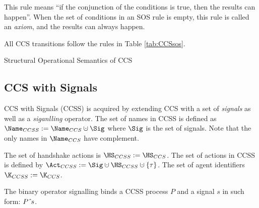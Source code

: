 \documentclass[adraft,hidelinks]{eptcs}
\begin{document}
This rule means ``if the conjunction of the conditions is true, then the results can happen''.
When the set of conditions in an SOS rule is empty, this rule is called an \emph{axiom}, and the results can always happen.

All CCS transitions follow the rules in Table \ref{tab:CCSsos}.

\begin{table}[t]
\normalsize
\centering
\caption{Structural Operational Semantics of CCS}
\label{tab:CCSsos}
\end{table}


\subsection{CCS with Signals}
\label{sec:ccss}
CCS with Signals (CCSS) \cite{DvGH17} is acquired by extending CCS with a set of \emph{signals} as well as a \emph{siganlling} operator.
The set of names in CCSS is defined as $\Name_{CCSS} := \Name_{CCS} \dcup \Sig$ where $\Sig$ is the set of signals.
Note that the only names in $\Name_{CCS}$ have complement.

The set of handshake actions is $\HS_{CCSS} := \HS_{CCS}$.
The set of actions in CCSS is defined by $\Act_{CCSS} := \Sig \dcup \HS_{CCSS} \dcup \{\tau\}$.
The set of agent identifiers $\K_{CCSS}:=\K_{CCS}$.

The binary operator signalling binds a CCSS process $P$ and a signal $s$ in such form: $P\mathrel{\hat{}\!} s$.
\end{document}
